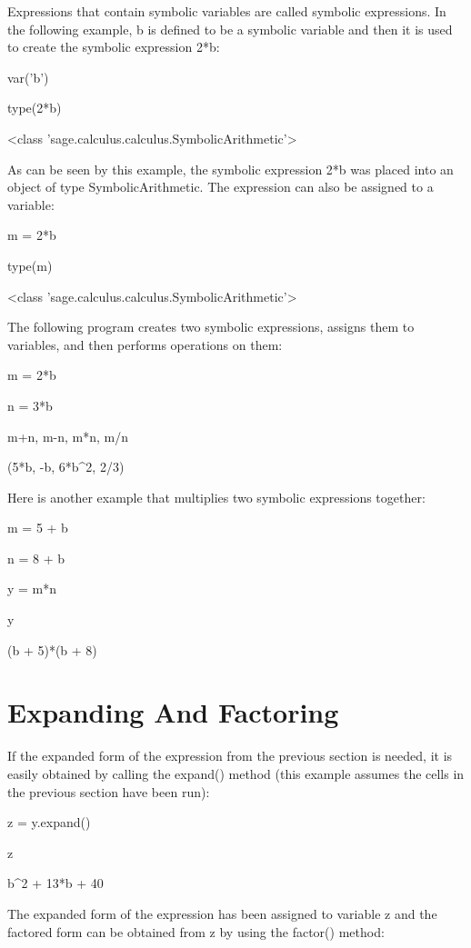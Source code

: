 \documentclass[12pt,oneside]{book}
\begin{document}
Expressions that contain symbolic variables are called symbolic expressions. In the following example, b is defined to be a symbolic variable and then it is used to create the symbolic expression 2*b: 

var('b')

type(2*b)

{\textbar}

{\textless}class 'sage.calculus.calculus.SymbolicArithmetic'{\textgreater}

As can be seen by this example, the symbolic expression 2*b was placed into an object of type SymbolicArithmetic. The expression can also be assigned to a variable: 

m = 2*b

type(m)

{\textbar}

{\textless}class 'sage.calculus.calculus.SymbolicArithmetic'{\textgreater}

The following program creates two symbolic expressions, assigns them to variables, and then performs operations on them: 

m = 2*b

n = 3*b

m+n, m{}-n, m*n, m/n

{\textbar}

(5*b, {}-b, 6*b\^{}2, 2/3)

Here is another example that multiplies two symbolic expressions together: 

m = 5 + b

n = 8 + b

y = m*n

y

{\textbar}

(b + 5)*(b + 8)

\section[Expanding And Factoring]{Expanding And Factoring}

If the expanded form of the expression from the previous section is needed, it is easily obtained by calling the expand() method (this example assumes the cells in the previous section have been run): 

z = y.expand()

z

{\textbar}

b\^{}2 + 13*b + 40

The expanded form of the expression has been assigned to variable z and the factored form can be obtained from z by using the factor() method: 
\end{document}
